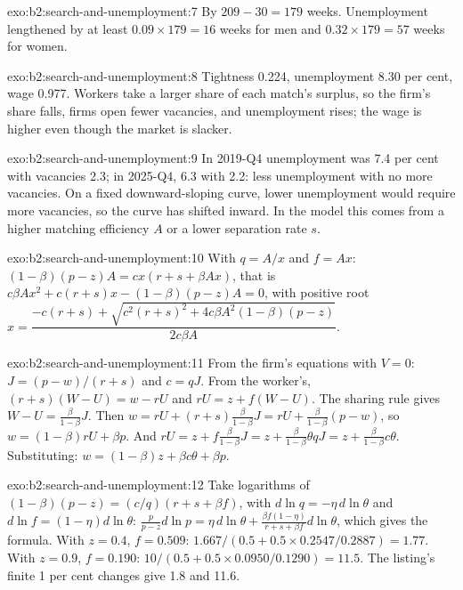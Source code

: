 \begin{solution}{exo:b2:search-and-unemployment:7}
By $209 - 30 = 179$ weeks. Unemployment lengthened by at least $0.09 \times 179 = 16$ weeks for men and $0.32 \times 179 = 57$ weeks for women.
\end{solution}

\begin{solution}{exo:b2:search-and-unemployment:8}
Tightness 0.224, unemployment 8.30 per cent, wage 0.977. Workers take a larger share of each match's surplus, so the firm's share
falls, firms open fewer vacancies, and unemployment rises; the wage is higher even though the market is slacker.
\end{solution}

\begin{solution}{exo:b2:search-and-unemployment:9}
In 2019-Q4 unemployment was 7.4 per cent with vacancies 2.3; in 2025-Q4, 6.3 with 2.2: less unemployment with no more vacancies.
On a fixed downward-sloping curve, lower unemployment would require more vacancies, so the curve has shifted inward. In the model this
comes from a higher matching efficiency $A$ or a lower separation rate $s$.
\end{solution}

\begin{solution}{exo:b2:search-and-unemployment:10}
With $q = A/x$ and $f = Ax$: $(1 - \beta)(p - z)A = cx(r + s + \beta Ax)$, that is $c\beta Ax^2 + c(r + s)x - (1 - \beta)(p - z)A = 0$, with positive root
$x = \dfrac{-c(r + s) + \sqrt{c^2(r + s)^2 + 4c\beta A^2(1 - \beta)(p - z)}}{2c\beta A}$.
\end{solution}

\begin{solution}{exo:b2:search-and-unemployment:11}
From the firm's equations with $V = 0$: $J = (p - w)/(r + s)$ and $c = qJ$. From the worker's, $(r + s)(W - U) = w - rU$ and $rU = z + f(W - U)$. The sharing rule gives $W - U = \tfrac{\beta}{1 - \beta}J$. Then
$w = rU + (r + s)\tfrac{\beta}{1 - \beta}J = rU + \tfrac{\beta}{1 - \beta}(p - w)$, so $w = (1 - \beta)rU + \beta p$. And $rU = z + f\tfrac{\beta}{1 - \beta}J = z + \tfrac{\beta}{1 - \beta}\theta qJ = z + \tfrac{\beta}{1 - \beta}c\theta$. Substituting: $w = (1 - \beta)z + \beta c\theta + \beta p$.
\end{solution}

\begin{solution}{exo:b2:search-and-unemployment:12}
Take logarithms of $(1 - \beta)(p - z) = (c/q)(r + s + \beta f)$, with $d\ln q = -\eta\,d\ln\theta$ and $d\ln f = (1 - \eta)d\ln\theta$: $\frac{p}{p - z}d\ln p = \eta\,d\ln\theta + \frac{\beta f(1 - \eta)}{r + s + \beta f}d\ln\theta$, which gives the formula. With $z = 0.4$, $f = 0.509$: $1.667/(0.5 + 0.5 \times 0.2547/0.2887) = 1.77$.
With $z = 0.9$, $f = 0.190$: $10/(0.5 + 0.5 \times 0.0950/0.1290) = 11.5$. The listing's finite 1 per cent changes give 1.8 and 11.6.
\end{solution}

